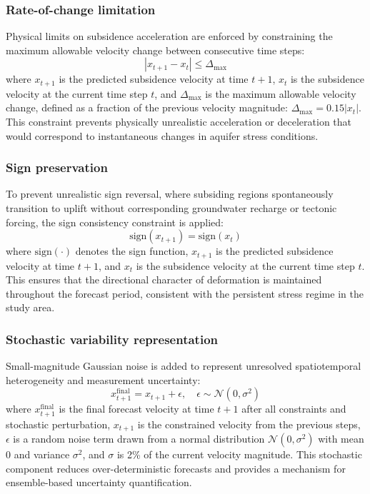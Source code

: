 \documentclass[oneside,doublespacing,flushright]{lsuthesis}
\begin{document}
\subsubsection{Rate-of-change limitation}

Physical limits on subsidence acceleration are enforced by constraining the maximum allowable velocity change between consecutive time steps:
\begin{equation}
|x_{t+1} - x_t| \leq \Delta_{\max}
\end{equation}
where $x_{t+1}$ is the predicted subsidence velocity at time $t+1$, $x_t$ is the subsidence velocity at the current time step $t$, and $\Delta_{\max}$ is the maximum allowable velocity change, defined as a fraction of the previous velocity magnitude: $\Delta_{\max} = 0.15|x_t|$. This constraint prevents physically unrealistic acceleration or deceleration that would correspond to instantaneous changes in aquifer stress conditions.

\subsubsection{Sign preservation}

To prevent unrealistic sign reversal, where subsiding regions spontaneously transition to uplift without corresponding groundwater recharge or tectonic forcing, the sign consistency constraint is applied:
\begin{equation}
\text{sign}(x_{t+1}) = \text{sign}(x_t)
\end{equation}
where $\text{sign}(\cdot)$ denotes the sign function, $x_{t+1}$ is the predicted subsidence velocity at time $t+1$, and $x_t$ is the subsidence velocity at the current time step $t$. This ensures that the directional character of deformation is maintained throughout the forecast period, consistent with the persistent stress regime in the study area.


\subsubsection{Stochastic variability representation}


Small-magnitude Gaussian noise is added to represent unresolved spatiotemporal heterogeneity and measurement uncertainty:
\begin{equation}
x_{t+1}^{\text{final}} = x_{t+1} + \epsilon, \quad \epsilon \sim \mathcal{N}(0, \sigma^2)
\end{equation}
where $x_{t+1}^{\text{final}}$ is the final forecast velocity at time $t+1$ after all constraints and stochastic perturbation, $x_{t+1}$ is 
the constrained velocity from the previous steps, $\epsilon$ is a random noise term drawn from a normal distribution $\mathcal{N}(0, \sigma^2)$ with mean 0 and variance $\sigma^2$, and $\sigma$ is 2\% of the current velocity magnitude. This stochastic component reduces over-deterministic forecasts and provides a mechanism for ensemble-based uncertainty quantification.
\end{document}

